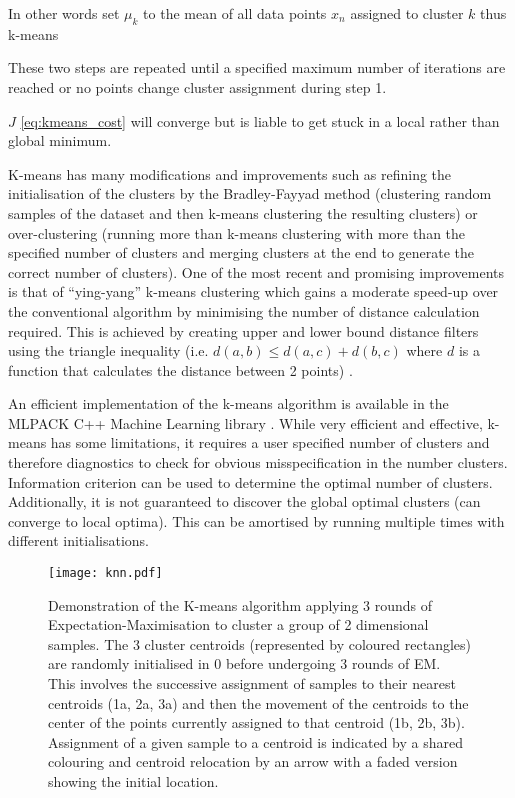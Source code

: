 In other words set \(\mu_{k}\) to the mean of all data points \(x_{n}\) assigned to cluster \(k\) thus k-means \citep{Bishop2006}

These two steps are repeated until a specified maximum number of iterations are reached or no points change cluster assignment during
step 1.

\(J\) \ref{eq:kmeans_cost} will converge but is liable to get stuck in a local rather than global minimum.

K-means has many modifications and improvements such as refining the initialisation of the clusters by 
the Bradley-Fayyad method (clustering random samples of the dataset and then k-means clustering the resulting clusters) \citep{Bradley1998} 
or over-clustering (running more than k-means clustering with more than the specified number of clusters and merging clusters at the end
to generate the correct number of clusters). One of the most recent and promising improvements is that of ``ying-yang'' k-means
clustering which gains a moderate speed-up over the conventional algorithm by minimising the number of distance calculation required.
This is achieved by creating upper and lower bound distance filters using the triangle inequality (i.e. \(d(a,b) \leq d(a,c) + d(b,c)\) where 
\(d\) is a function that calculates the distance between 2 points) \citep{Ding2015}.



An efficient implementation of the k-means algorithm is available in the MLPACK C++ Machine Learning library \citep{mlpack2013}.
While very efficient and effective, k-means has some limitations, it requires a user specified number of clusters
and therefore diagnostics to check for obvious misspecification in the number clusters.  Information criterion
can be used to determine the optimal number of clusters.
Additionally, it is not guaranteed
to discover the global optimal clusters (can converge to local optima).  This can be amortised by running multiple times 
with different initialisations.

\begin{figure}[h]
    \texttt{[image: knn.pdf]}
    \caption{Demonstration of the K-means algorithm applying 3 rounds of Expectation-Maximisation to cluster
        a group of 2 dimensional samples.  The 3 cluster centroids (represented by coloured rectangles) 
        are randomly initialised in 0 before undergoing 3 rounds of EM.  
        This involves the successive assignment of samples to their nearest centroids (1a, 2a, 3a) 
and then the movement of the centroids to the center of the points currently assigned to that centroid (1b, 2b, 3b).
Assignment of a given sample to a centroid is indicated by a shared colouring and centroid relocation by
an arrow with a faded version showing the initial location.
}
    \label{fig:knn}
\end{figure}

